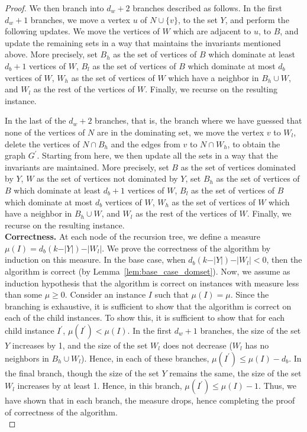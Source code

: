 \begin{proof}
We then branch into $d_w+2$ branches described as follows. In the first $d_w+1$ branches, we move a vertex $u$ of $N \cup \{v\}$, to the set $Y$, and perform the following updates. We move the vertices of $W$ which are adjacent to $u$, to $B$, and update the remaining sets in a way that maintains the invariants mentioned above. More precisely, set $B_h$ as the set of vertices of $B$ which dominate at least $d_b+1$ vertices of $W$, $B_l$ as the set of vertices of $B$ which dominate at most $d_b$ vertices of $W$, $W_h$ as the set of vertices of $W$ which have a neighbor in $B_h\cup W$, and $W_l$ as the rest of the vertices of $W$. Finally, we recurse on the resulting instance.



In the last of the $d_w+2$ branches, that is, the branch where we have guessed that none of the vertices of $N$ are in the dominating set, we move the vertex $v$ to $W_l$, delete the vertices of $N\cap B_h$ and the edges from $v$ to $N\cap W_h$, to obtain the graph $G^\prime$. Starting from here, we then update all the sets in a way that the invariants are maintained. More precisely, set $B$ as the set of vertices dominated by $Y$, $W$ as the set of vertices not dominated by $Y$, set $B_h$ as the set of vertices of $B$ which dominate at least $d_b+1$ vertices of $W$, $B_l$ as the set of vertices of $B$ which dominate at most $d_b$ vertices of $W$, $W_h$ as the set of vertices of $W$ which have a neighbor in $B_h\cup W$, and $W_l$ as the rest of the vertices of $W$. Finally, we recurse on the resulting instance.\\


\noindent
{\bf Correctness.}
At each node of the recursion tree, we define a measure $\mu(I)=d_b (k-\vert Y\vert)-\vert W_l\vert$. We prove the correctness of the algorithm by induction on this measure. In the base case, when $d_b (k-\vert Y\vert)-\vert W_l\vert < 0$, then the algorithm is correct (by Lemma~\ref{lem:base_case_domset}). Now, we assume as induction hypothesis that the algorithm is correct on instances with measure less than some $\mu\geq 0$. Consider an instance $I$ such that $\mu(I)=\mu$. Since the branching is exhaustive, it is sufficient to show that the algorithm is correct on each of the child instances. To show this, it is sufficient to show that for each child instance $I^\prime$, $\mu(I^\prime)<\mu(I)$. In the first $d_w+1$ branches, the size of the set $Y$ increases by 1, and the size of the set $W_l$ does not decrease ($W_l$ has no neighbors in $B_h\cup W_l$). Hence, in each of these branches, $\mu(I^\prime)\leq \mu(I)-d_b$. In the final branch, though the size of the set $Y$ remains the 
same, the size of the set $W_l$ increases by at least 1. 
Hence, in this branch, $\mu(I^\prime)\leq \mu(I)-1$. Thus, we have shown that in each branch, the measure drops, hence completing the proof of correctness of the algorithm.\\


\end{proof}
